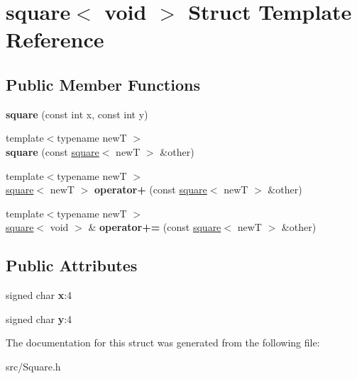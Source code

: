 \hypertarget{structsquare_3_01void_01_4}{}\section{square$<$ void $>$ Struct Template Reference}
\label{structsquare_3_01void_01_4}
\subsection*{Public Member Functions}
\begin{DoxyCompactItemize}
\item 
\mbox{\label{structsquare_3_01void_01_4_acad0604c4c01934956f9e547b61963bd}} 
{\bfseries square} (const int x, const int y)
\item 
\mbox{\label{structsquare_3_01void_01_4_a3144b85567ed10bfc6ecc5cafbe4e4ac}} 
{\footnotesize template$<$typename newT $>$ }\\{\bfseries square} (const \hyperlink{structsquare}{square}$<$ newT $>$ \&other)
\item 
\mbox{\label{structsquare_3_01void_01_4_ab7ae9a220b3d4aa3afce1873c25558eb}} 
{\footnotesize template$<$typename newT $>$ }\\\hyperlink{structsquare}{square}$<$ newT $>$ {\bfseries operator+} (const \hyperlink{structsquare}{square}$<$ newT $>$ \&other)
\item 
\mbox{\label{structsquare_3_01void_01_4_ad485847afc64f74cbae220e801dd3c38}} 
{\footnotesize template$<$typename newT $>$ }\\\hyperlink{structsquare}{square}$<$ void $>$ \& {\bfseries operator+=} (const \hyperlink{structsquare}{square}$<$ newT $>$ \&other)
\end{DoxyCompactItemize}
\subsection*{Public Attributes}
\begin{DoxyCompactItemize}
\item 
\mbox{\label{structsquare_3_01void_01_4_a1b2185b1eacd68916a02287c21916a25}} 
signed char {\bfseries x}\+:4
\item 
\mbox{\label{structsquare_3_01void_01_4_a2f5565ddd32970d151f1973db2fc3881}} 
signed char {\bfseries y}\+:4
\end{DoxyCompactItemize}


The documentation for this struct was generated from the following file\+:\begin{DoxyCompactItemize}
\item 
src/Square.\+h\end{DoxyCompactItemize}
